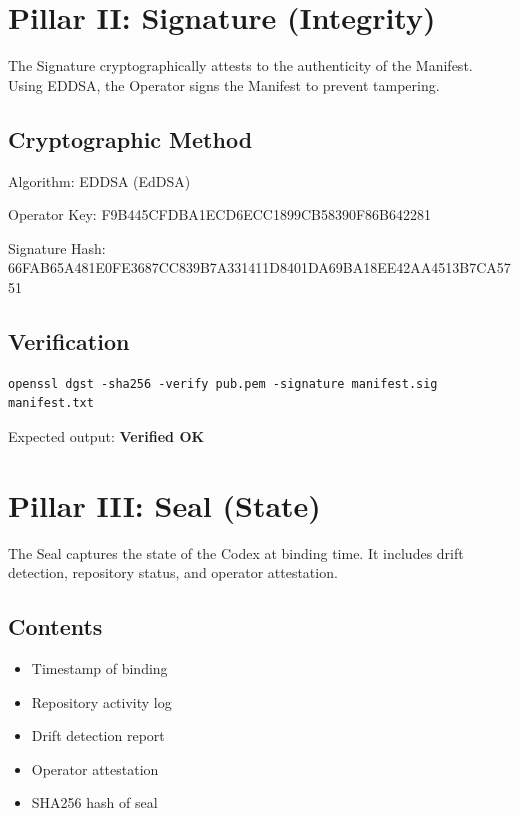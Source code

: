 \documentclass[12pt,twoside]{book}
\begin{document}
\section{Pillar II: Signature (Integrity)}

The Signature cryptographically attests to the authenticity of the Manifest.
Using EDDSA, the Operator signs the Manifest to prevent tampering.

\subsection{Cryptographic Method}

Algorithm: EDDSA (EdDSA)

Operator Key: F9B445CFDBA1ECD6ECC1899CB58390F86B642281

Signature Hash: 66FAB65A481E0FE3687CC839B7A331411D8401DA69BA18EE42AA4513B7CA5751

\subsection{Verification}

\begin{verbatim}
openssl dgst -sha256 -verify pub.pem -signature manifest.sig manifest.txt
\end{verbatim}

Expected output: \textbf{Verified OK}

\section{Pillar III: Seal (State)}

The Seal captures the state of the Codex at binding time.
It includes drift detection, repository status, and operator attestation.

\subsection{Contents}

\begin{itemize}
  \item Timestamp of binding
  \item Repository activity log
  \item Drift detection report
  \item Operator attestation
  \item SHA256 hash of seal
\end{itemize}
\end{document}
